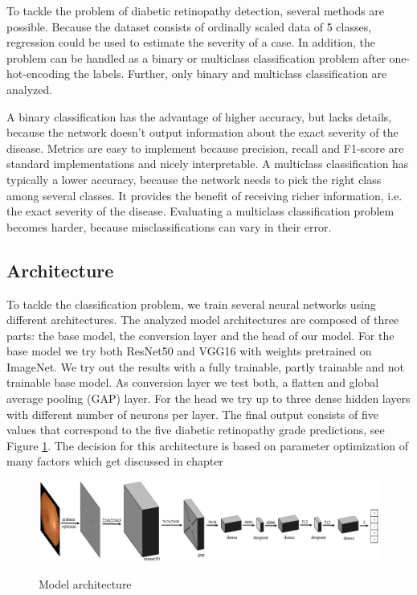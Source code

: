 \documentclass{article}
\begin{document}
To tackle the problem of diabetic retinopathy detection, several methods are possible. Because the dataset consists of 
ordinally scaled data of 5 classes, regression could be used to estimate the severity of a case. In addition, the problem 
can be handled as a binary or multiclass classification problem after one-hot-encoding the labels.
Further, only binary and multiclass classification are analyzed.

A binary classification has the advantage of higher accuracy, but lacks details, because the network doesn't output 
information about the exact severity of the disease. Metrics are easy to implement because precision, 
recall and F1-score are standard implementations and nicely interpretable. A multiclass classification has typically a 
lower accuracy, because the network needs to pick the right class among 
several classes. It provides the benefit of receiving richer information, i.e. the exact severity of the disease.
Evaluating a multiclass classification problem becomes harder, because misclassifications can vary in their error.

\subsection{Architecture}
To tackle the classification problem, we train several neural networks using different architectures.
The analyzed model architectures are composed of three parts: the 
base model, the conversion layer and the head of our model. For the base model we try both ResNet50 and VGG16 with 
weights pretrained on ImageNet. We try out the results with a fully trainable, partly trainable and not trainable
base model. As conversion layer we test both, a flatten and global average pooling (GAP) layer.
For the head we try up to three dense hidden layers with different number of neurons per layer.
The final output consists of five values that correspond to the five diabetic retinopathy grade predictions, see Figure \ref{fig:architecture}.
The decision for this architecture is based on parameter optimization of many factors which get discussed in chapter%
\begin{figure}[h]
  \centering
  \includegraphics[width=1\textwidth]{2_2_architecture.png}\label{fig:architecture}
  \caption{Model architecture}
  \label{fig:architecture}
\end{figure}
\end{document}
